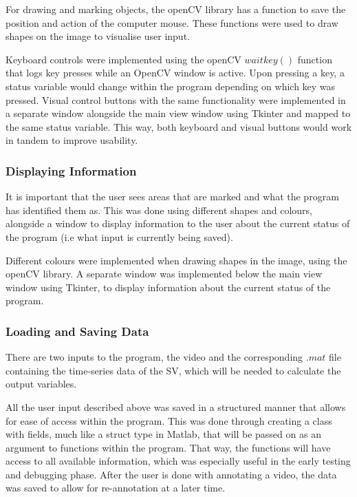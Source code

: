 For drawing and marking objects, the openCV library has a function to save the position and action of the computer mouse. These functions were used to draw shapes on the image to visualise user input. 

Keyboard controls were implemented using the openCV $waitkey()$ function that logs key presses while an OpenCV window is active. Upon pressing a key, a status variable would change within the program depending on which key was pressed. Visual control buttons with the same functionality were implemented in a separate window alongside the main view window using Tkinter and mapped to the same status variable. This way, both keyboard and visual buttons would work in tandem to improve usability. 

\subsubsection{Displaying Information}

It is important that the user sees areas that are marked and what the program has identified them as. This was done using different shapes and colours, alongside a window to display information to the user about the current status of the program (i.e what input is currently being saved). 

Different colours were implemented when drawing shapes in the image, using the openCV library. A separate window was implemented below the main view window using Tkinter, to display information about the current status of the program.

\subsubsection{Loading and Saving Data}
\label{sec:Loading_and_saving_data}

There are two inputs to the program, the video and the corresponding $.mat$ file containing the time-series data of the SV, which will be needed to calculate the output variables.

All the user input described above was saved in a structured manner that allows for ease of access within the program. This was done through creating a class with fields, much like a struct type in Matlab, that will be passed on as an argument to functions within the program. That way, the functions will have access to all available information, which was especially useful in the early testing and debugging phase. After the user is done with annotating a video, the data was saved to allow for re-annotation at a later time.

